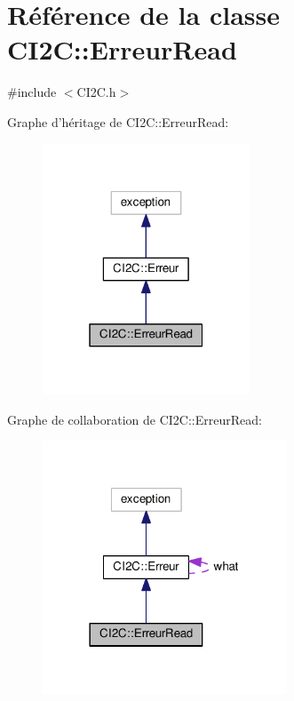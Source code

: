 \hypertarget{class_c_i2_c_1_1_erreur_read}{\section{Référence de la classe C\+I2\+C\+:\+:Erreur\+Read}
\label{class_c_i2_c_1_1_erreur_read}
}


{\ttfamily \#include $<$C\+I2\+C.\+h$>$}



Graphe d'héritage de C\+I2\+C\+:\+:Erreur\+Read\+:
\nopagebreak
\begin{figure}[H]
\begin{center}
\leavevmode
\includegraphics[width=175pt]{class_c_i2_c_1_1_erreur_read__inherit__graph}
\end{center}
\end{figure}


Graphe de collaboration de C\+I2\+C\+:\+:Erreur\+Read\+:
\nopagebreak
\begin{figure}[H]
\begin{center}
\leavevmode
\includegraphics[width=206pt]{class_c_i2_c_1_1_erreur_read__coll__graph}
\end{center}
\end{figure}
